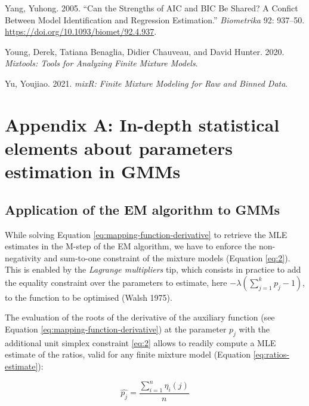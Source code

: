 \begin{CSLReferences}{1}{0}
\leavevmode{}%
Yang, Yuhong. 2005. {``Can the Strengths of {AIC} and {BIC} Be Shared? {A} Confict Between Model Identification and Regression Estimation.''} \emph{Biometrika} 92: 937--50. \url{https://doi.org/10.1093/biomet/92.4.937}.

\leavevmode{}%
Young, Derek, Tatiana Benaglia, Didier Chauveau, and David Hunter. 2020. \emph{Mixtools: Tools for Analyzing Finite Mixture Models}.

\leavevmode{}%
Yu, Youjiao. 2021. \emph{mixR: Finite Mixture Modeling for Raw and Binned Data}.

\end{CSLReferences}

\appendix

\hypertarget{appendix-a-in-depth-statistical-elements-about-parameters-estimation-in-gmms}{%
\section{Appendix A: In-depth statistical elements about parameters estimation in GMMs}\label{appendix-a-in-depth-statistical-elements-about-parameters-estimation-in-gmms}}

\hypertarget{application-of-the-em-algorithm-to-gmms}{%
\subsection{Application of the EM algorithm to GMMs}\label{application-of-the-em-algorithm-to-gmms}}

While solving Equation \eqref{eq:mapping-function-derivative} to retrieve the MLE estimates in the M-step of the EM algorithm, we have to enforce the non-negativity and sum-to-one constraint of the mixture models (Equation
\eqref{eq:2}). This is enabled by the \emph{Lagrange multipliers} tip, which consists in practice to add the equality constraint over the parameters to estimate, here \(-\lambda (\sum_{j=1}^k p_j -1)\), to the function to be optimised (Walsh 1975).

The evaluation of the roots of the derivative of the auxiliary function
(see Equation \eqref{eq:mapping-function-derivative}) at the parameter \(p_j\) with the additional unit simplex constraint \eqref{eq:2} allows to readily compute a MLE estimate of the ratios, valid for any finite mixture model (Equation \eqref{eq:ratios-estimate}):

\begin{equation}
\hat{p_j}= \frac{\sum_{i=1}^n \eta_{i}(j)}{n}
\label{eq:ratios-estimate}
\end{equation}

